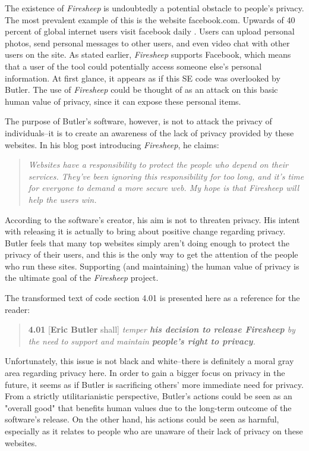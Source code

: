 \documentclass[11pt]{article}
\begin{document}
\begin{multicols}{2}
The existence of \emph{Firesheep} is undoubtedly a potential obstacle to people's privacy. The most prevalent example of this is the website facebook.com. Upwards of 40 percent of global internet users visit facebook daily \cite{alexa}. Users can upload personal photos, send personal messages to other users, and even video chat with other users on the site. As stated earlier, \emph{Firesheep} supports Facebook, which means that a user of the tool could potentially access someone else's personal information. At first glance, it appears as if this SE code was overlooked by Butler. The use of \emph{Firesheep} could be thought of as an attack on this basic human value of privacy, since it can expose these personal items.

The purpose of Butler's software, however, is not to attack the privacy of individuals--it is to create an awareness of the lack of privacy provided by these websites. In his blog post introducing \emph{Firesheep}, he claims:

\begin{quote}
\emph{Websites have a responsibility to protect the people who depend on their services. They've been ignoring this responsibility for too long, and it's time for everyone to demand a more secure web. My hope is that Firesheep will help the users win.} \cite{codebutler_main}
\end{quote}

According to the software's creator, his aim is not to threaten privacy. His intent with releasing it is actually to bring about positive change regarding privacy. Butler feels that many top websites simply aren't doing enough to protect the privacy of their users, and this is the only way to get the attention of the people who run these sites. Supporting (and maintaining) the human value of privacy is the ultimate goal of the \emph{Firesheep} project.

The transformed text of code section 4.01 is presented here as a reference for the reader:

\begin{quote}
\textbf{4.01} [\textbf{Eric Butler} shall] \emph{temper \textbf{his decision to release Firesheep} by the need to support and maintain \textbf{people's right to privacy}.} \cite{se_code}
\end{quote}

Unfortunately, this issue is not black and white--there is definitely a moral gray area regarding privacy here. In order to gain a bigger focus on privacy in the future, it seems as if Butler is sacrificing others' more immediate need for privacy. From a strictly utilitarianistic perspective, Butler's actions could be seen as an "overall good" that benefits human values due to the long-term outcome of the software's release. On the other hand, his actions could be seen as harmful, especially as it relates to people who are unaware of their lack of privacy on these websites.


\end{multicols}
\end{document}
